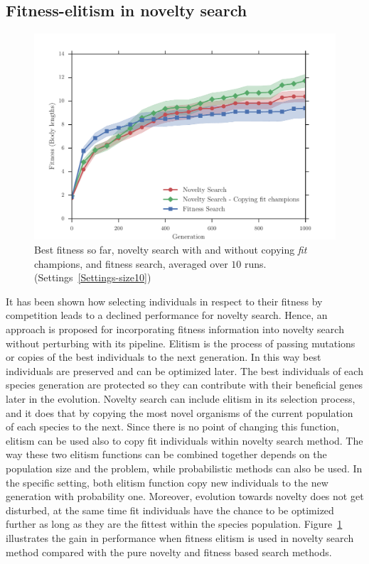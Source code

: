 \subsection*{Fitness-elitism in novelty search}

\begin{figure}[t!]
\centering
\includegraphics[width=1.0\textwidth]{../Figures/Results/CopyFitChampions10.pdf}
\caption{Best fitness so far, novelty search with and without copying \emph{fit} champions, and fitness search, averaged over $10$ runs. (Settings~\ref{Settings-size10})}
\label{fig:CopyFitChampions10}
\end{figure}

It has been shown how selecting individuals in respect to their fitness by competition leads to a declined performance for novelty search. Hence, an approach is proposed for incorporating fitness information into novelty search without perturbing with its pipeline. Elitism is the process of passing mutations or copies of the best individuals to the next generation. In this way best individuals are preserved and can be optimized later. The best individuals of each species generation are protected so they can contribute with their beneficial genes later in the evolution. Novelty search can include elitism in its selection process, and it does that by copying the most novel organisms of the current population of each species to the next. Since there is no point of changing this function, elitism can be used also to copy fit individuals within novelty search method. The way these two elitism functions can be combined together depends on the population size and the problem, while probabilistic methods can also be used. In the specific setting, both elitism function copy new individuals to the new generation with probability one. Moreover, evolution towards novelty does not get disturbed, at the same time fit individuals have the chance to be optimized further as long as they are the fittest within the species population. Figure~\ref{fig:CopyFitChampions10} illustrates the gain in performance when fitness elitism is used in novelty search method compared with the pure novelty and fitness based search methods.



